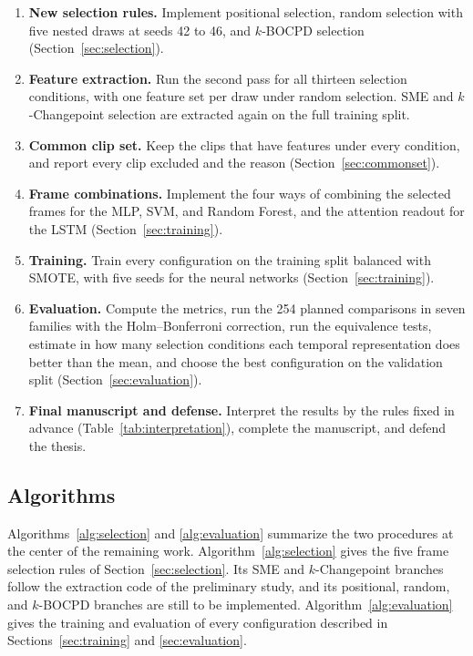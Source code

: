 \begin{enumerate}
   \item \textbf{New selection rules.} Implement positional selection, random selection with five nested draws at seeds 42 to 46, and $k$-BOCPD selection (Section~\ref{sec:selection}).
   \item \textbf{Feature extraction.} Run the second pass for all thirteen selection conditions, with one feature set per draw under random selection. SME and $k$-Changepoint selection are extracted again on the full training split.
   \item \textbf{Common clip set.} Keep the clips that have features under every condition, and report every clip excluded and the reason (Section~\ref{sec:commonset}).
   \item \textbf{Frame combinations.} Implement the four ways of combining the selected frames for the MLP, SVM, and Random Forest, and the attention readout for the LSTM (Section~\ref{sec:training}).
   \item \textbf{Training.} Train every configuration on the training split balanced with SMOTE, with five seeds for the neural networks (Section~\ref{sec:training}).
   \item \textbf{Evaluation.} Compute the metrics, run the 254 planned comparisons in seven families with the Holm--Bonferroni correction, run the equivalence tests, estimate in how many selection conditions each temporal representation does better than the mean, and choose the best configuration on the validation split (Section~\ref{sec:evaluation}).
   \item \textbf{Final manuscript and defense.} Interpret the results by the rules fixed in advance (Table~\ref{tab:interpretation}), complete the manuscript, and defend the thesis.
\end{enumerate}

\subsection{Algorithms}
\label{sec:algorithms}

Algorithms~\ref{alg:selection} and \ref{alg:evaluation} summarize the two procedures at the center of the remaining work. Algorithm~\ref{alg:selection} gives the five frame selection rules of Section~\ref{sec:selection}. Its SME and $k$-Changepoint branches follow the extraction code of the preliminary study, and its positional, random, and $k$-BOCPD branches are still to be implemented. Algorithm~\ref{alg:evaluation} gives the training and evaluation of every configuration described in Sections~\ref{sec:training} and \ref{sec:evaluation}.

